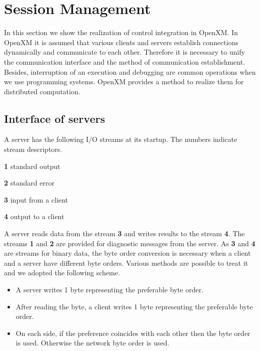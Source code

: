 
\section{Session Management}
\label{secsession}
 
In this section we show the realization of control integration in
OpenXM.  In OpenXM it is assumed that various clients and servers
establish connections dynamically and communicate to each
other. Therefore it is necessary to unify the communication interface
and the method of communication establishment.  Besides, interruption
of an execution and debugging are common operations when we use
programming systems. OpenXM provides a method to realize them for
distributed computation.

\subsection{Interface of servers}

A server has the following I/O streams at its startup. The numbers
indicate stream descriptors.

\begin{description}
\item{\bf 1} standard output
\item{\bf 2} standard error
\item{\bf 3} input from a client
\item{\bf 4} output to a client
\end{description}

A server reads data from the stream {\bf 3} and writes results to the
stream {\bf 4}. The streams {\bf 1} and {\bf 2} are provided for
diagnostic messages from the server.  As {\bf 3} and {\bf 4} are
streams for binary data, the byte order conversion is necessary when a
client and a server have different byte orders. Various
methods are possible to treat it and we adopted the following scheme.

\begin{itemize}
\item A server writes 1 byte representing the preferable byte order.
\item After reading the byte, a client writes 1 byte representing the
preferable byte order.
\item On each side, if the preference coincides with each other then
the byte order is used. Otherwise the network byte order is used.
\end{itemize}

